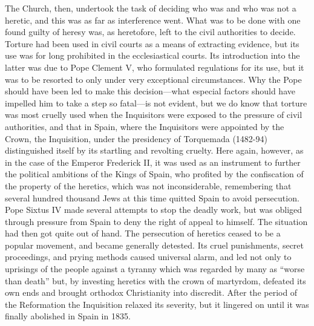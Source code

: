 \documentclass{book}
\begin{document}
The Church, then, undertook the task of deciding who was and who was not a heretic, and this was as far as interference went. What was to be done with one found guilty of heresy was, as heretofore, left to the civil authorities to decide. Torture had been used in civil courts as a means of extracting evidence, but its use was for long prohibited in the ecclesiastical courts. Its introduction into the latter was due to Pope Clement V, who formulated regulations for its use, but it was to be resorted to only under very exceptional circumstances. Why the Pope should have been led to make this decision—what especial factors should have impelled him to take a step so fatal—is not evident, but we do know that torture was most cruelly used when the Inquisitors were exposed to the pressure of civil authorities, and that in Spain, where the Inquisitors were appointed by the Crown, the Inquisition, under the presidency of Torquemada (1482-94) distinguished itself by its startling and revolting cruelty. Here again, however, as in the case of the Emperor Frederick II, it was used as an instrument to further the political ambitions of the Kings of Spain, who profited by the confiscation of the property of the heretics, which was not inconsiderable, remembering that several hundred thousand Jews at this time quitted Spain to avoid persecution. Pope Sixtus IV made several attempts to stop the deadly work, but was obliged through pressure from Spain to deny the right of appeal to himself. The situation had then got quite out of hand. The persecution of heretics ceased to be a popular movement, and became generally detested. Its cruel punishments, secret proceedings, and prying methods caused universal alarm, and led not only to uprisings of the people against a tyranny which was regarded by many as “worse than death” but, by investing heretics with the crown of martyrdom, defeated its own ends and brought orthodox Christianity into discredit. After the period of the Reformation the Inquisition relaxed its severity, but it lingered on until it was finally abolished in Spain in 1835.
\end{document}
